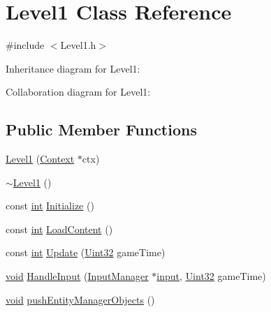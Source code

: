 \hypertarget{class_level1}{\section{Level1 Class Reference}
\label{class_level1}
}


{\ttfamily \#include $<$Level1.\-h$>$}



Inheritance diagram for Level1\-:


Collaboration diagram for Level1\-:
\subsection*{Public Member Functions}
\begin{DoxyCompactItemize}
\item 
\hyperlink{class_level1_a312ea5984a944497f7a6fcfda0d1c0e2}{Level1} (\hyperlink{class_context}{Context} $\ast$ctx)
\item 
\hyperlink{class_level1_adfbd315a62b31d3ca07da24fc9c69d82}{$\sim$\-Level1} ()
\item 
const \hyperlink{_s_d_l__thread_8h_a6a64f9be4433e4de6e2f2f548cf3c08e}{int} \hyperlink{class_level1_ad4203f97fa3741633939bb583d6dafc3}{Initialize} ()
\item 
const \hyperlink{_s_d_l__thread_8h_a6a64f9be4433e4de6e2f2f548cf3c08e}{int} \hyperlink{class_level1_a440f9b749647f81cacf51075378ad93d}{Load\-Content} ()
\item 
const \hyperlink{_s_d_l__thread_8h_a6a64f9be4433e4de6e2f2f548cf3c08e}{int} \hyperlink{class_level1_a091d8b77a6f1057521b6d9695692cdc9}{Update} (\hyperlink{_s_d_l__stdinc_8h_add440eff171ea5f55cb00c4a9ab8672d}{Uint32} game\-Time)
\item 
\hyperlink{_s_d_l__opengl_8h_a3db05964a3cc4410f35b7ea2b7eb850d}{void} \hyperlink{class_level1_a20d6bceb8946a9257c84b2bea8df4f04}{Handle\-Input} (\hyperlink{class_input_manager}{Input\-Manager} $\ast$\hyperlink{_g_l_e_w_2glew_8h_ad3c78daa7d8673f71649d4840c641779}{input}, \hyperlink{_s_d_l__stdinc_8h_add440eff171ea5f55cb00c4a9ab8672d}{Uint32} game\-Time)
\item 
\hyperlink{_s_d_l__opengl_8h_a3db05964a3cc4410f35b7ea2b7eb850d}{void} \hyperlink{class_level1_aedce6d1bc1d8abb4b1f60c9e469a0956}{push\-Entity\-Manager\-Objects} ()
\end{DoxyCompactItemize}
